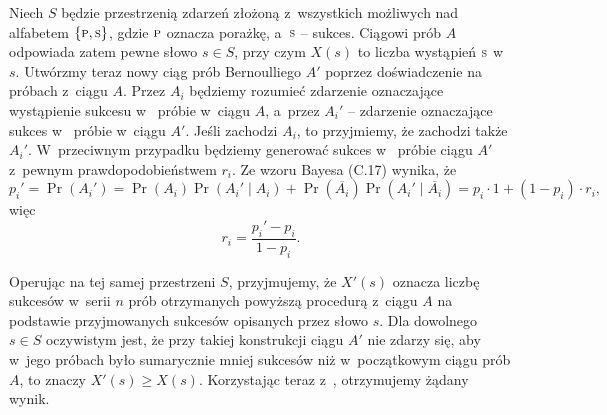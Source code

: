 \exercise %
Niech $S$ będzie przestrzenią zdarzeń złożoną z~wszystkich możliwych  nad alfabetem $\{{\scriptstyle\rm P},{\scriptstyle\rm S}\}$, gdzie ${\scriptstyle\rm P}$ oznacza porażkę, a~${\scriptstyle\rm S}$ -- sukces.
Ciągowi prób $A$ odpowiada zatem pewne słowo $s\in S$, przy czym $X(s)$ to liczba wystąpień ${\scriptstyle\rm S}$ w~$s$.
Utwórzmy teraz nowy ciąg prób Bernoulliego $A'$ poprzez doświadczenie na próbach z~ciągu $A$.
Przez $A_i$ będziemy rozumieć zdarzenie oznaczające wystąpienie sukcesu w~ próbie w~ciągu $A$, a~przez $A_i'$ -- zdarzenie oznaczające sukces w~ próbie w~ciągu $A'$.
Jeśli zachodzi $A_i$, to przyjmiemy, że zachodzi także $A_i'$.
W~przeciwnym przypadku będziemy generować sukces w~ próbie ciągu $A'$ z~pewnym prawdopodobieństwem $r_i$.
Ze wzoru Bayesa (C.17) wynika, że
\[
    p_i' = \Pr(A_i') = \Pr(A_i)\Pr(A_i'\mid A_i)+\Pr(\overline{A_i})\Pr(A_i'\mid\overline{A_i}) = p_i\cdot1+(1-p_i)\cdot r_i,
\]
więc
\[
    r_i = \frac{p_i'-p_i}{1-p_i}.
\]

Operując na tej samej przestrzeni $S$, przyjmujemy, że $X'(s)$ oznacza liczbę sukcesów w~serii $n$ prób otrzymanych powyższą procedurą z~ciągu $A$ na podstawie przyjmowanych sukcesów opisanych przez słowo $s$.
Dla dowolnego $s\in S$ oczywistym jest, że przy takiej konstrukcji ciągu $A'$ nie zdarzy się, aby w~jego próbach było sumarycznie mniej sukcesów niż w~początkowym ciągu prób $A$, to znaczy $X'(s)\ge X(s)$.
Korzystając teraz z~, otrzymujemy żądany wynik.
